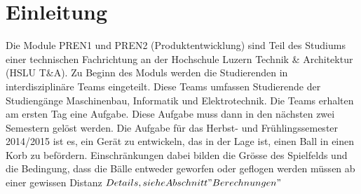 \section{Einleitung}
Die Module PREN1 und PREN2 (Produktentwicklung) sind Teil des Studiums einer 
technischen Fachrichtung an der Hochschule Luzern Technik \& Architektur 
(HSLU T\&A). 
Zu Beginn des Moduls werden die Studierenden in interdisziplinäre Teams 
eingeteilt. Diese Teams umfassen Studierende der Studiengänge Maschinenbau, 
Informatik und Elektrotechnik. Die Teams erhalten am ersten Tag eine Aufgabe. 
Diese Aufgabe muss dann in den nächsten zwei Semestern gelöst werden. 
Die Aufgabe für das Herbst- und Frühlingssemester 2014/2015 ist es, ein Gerät
zu entwickeln, das in der Lage ist, einen Ball in einen Korb zu befördern.
Einschränkungen dabei bilden die Grösse des Spielfelds und die Bedingung, dass
die Bälle entweder geworfen oder geflogen werden müssen ab einer gewissen Distanz
\(Details, siehe Abschnitt "Berechnungen"\)